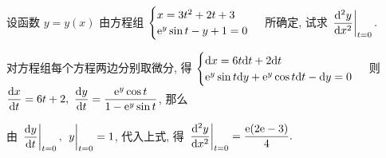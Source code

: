 \begin{example}
    设函数 $y=y(x)$ 由方程组 $\begin{cases}
        x=3t^2+2t+3\\ \mathrm{e}^y\sin t-y+1=0
    \end{cases}$ 所确定, 试求 $\displaystyle\eval{\dv[2]{y}{x}}_{t=0}.$
\end{example}
\begin{solution}
    对方程组每个方程两边分别取微分, 得 $\begin{cases}
        \dd x=6t\dd t+2\dd t\\ \mathrm{e}^y\sin t\dd y+\mathrm{e}^y\cos t\dd t-\dd y=0
    \end{cases}$ 则 $\displaystyle\dv{x}{t}=6t+2,~\dv{y}{t}=\dfrac{\mathrm{e}^y\cos t}{1-\mathrm{e}^y\sin t}$, 那么 
    由 $\displaystyle\eval{\dv{y}{t}}_{t=0},~\eval{y}_{t=0}=1$, 代入上式, 得 $\displaystyle\eval{\dv[2]{y}{x}}_{t=0}=\dfrac{\e(2\e-3)}{4}.$
\end{solution}

